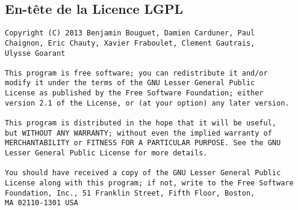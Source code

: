 \begin{appendices}
	\chapter{En-tête de la Licence LGPL}
	\label{licence}

\begin{lstlisting}
Copyright (C) 2013 Benjamin Bouguet, Damien Carduner, Paul 
Chaignon, Eric Chauty, Xavier Fraboulet, Clement Gautrais, 
Ulysse Goarant

This program is free software; you can redistribute it and/or
modify it under the terms of the GNU Lesser General Public
License as published by the Free Software Foundation; either
version 2.1 of the License, or (at your option) any later version.

This program is distributed in the hope that it will be useful,
but WITHOUT ANY WARRANTY; without even the implied warranty of
MERCHANTABILITY or FITNESS FOR A PARTICULAR PURPOSE. See the GNU
Lesser General Public License for more details.

You should have received a copy of the GNU Lesser General Public
License along with this program; if not, write to the Free Software
Foundation, Inc., 51 Franklin Street, Fifth Floor, Boston, 
MA 02110-1301 USA
\end{lstlisting}

\end{appendices}
